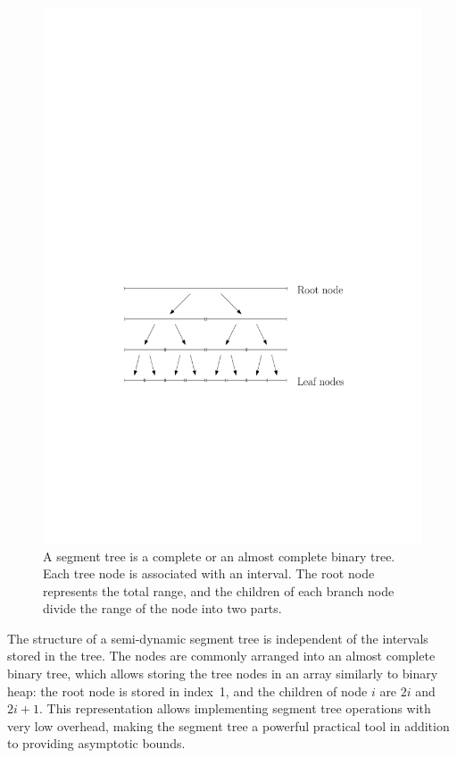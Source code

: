 \documentclass[english,gradu]{tktltiki2018}
\begin{document}
\begin{figure}\centering
	\includegraphics[scale=0.7,page=1]{fig/segtree}
	\caption{A segment tree is a complete or an almost complete binary tree.
	Each tree node is associated with an interval.
	The root node represents the total range, and the children of each branch node divide the range of the node into two parts.}\label{fig:segtree}
\end{figure}

The structure of a semi-dynamic segment tree is independent of the intervals stored in the tree.
The nodes are commonly arranged into an almost complete binary tree, which allows storing the tree nodes in an array similarly to binary heap:
the root node is stored in index~1, and the children of node $i$ are $2i$ and $2i+1$.
This representation allows implementing segment tree operations with very low overhead, making the segment tree a powerful practical tool in addition to providing asymptotic bounds.
\end{document}
